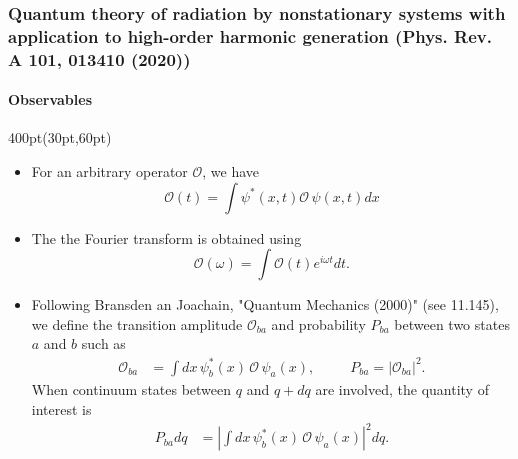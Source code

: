 \begin{frame}
\frametitle{Quantum theory of radiation by nonstationary systems 
	with application to high-order harmonic generation
        (Phys. Rev. A 101, 013410 (2020))}
	\framesubtitle{Observables}

\begin{textblock*}{400pt}(30pt,60pt)
\footnotesize
\begin{itemize}
	\item For an arbitrary operator $\mathcal{O}$, we have   
\begin{equation}
	\mathcal{O}(t) = \int \psi^{*}(x,t)\mathcal{O}\,\psi(x,t)dx
\label{eqn:mean_value}
\end{equation}
\item The the Fourier transform is obtained using 
\begin{equation}
	\mathcal{O}(\omega) = \int \mathcal{O}(t)e^{i\omega t}dt.
\label{eqn:fourier}
\end{equation}
\item Following Bransden an Joachain, "Quantum Mechanics (2000)" (see 11.145), we define the transition amplitude $\mathcal{O}_{ba}$  and probability $P_{ba}$ 
 between two states $a$ and $b$ such as
\begin{align}
	\mathcal{O}_{ba} & = \int dx\, \psi_b^*(x)\,\mathcal{O}\,\psi_a (x), 
	\hspace{30pt}
	P_{ba}  = \left| \mathcal{O}_{ba} \right|^2.
\end{align}
When continuum states between $q$ and $q+dq$ are involved,
the quantity of interest is  
\begin{align}
	P_{ba} dq & = \left| \int dx\, \psi^*_b(x)\,\mathcal{O}\,
	 \psi_a (x) \right|^2 dq.
\end{align}
\end{itemize}
\end{textblock*}


\end{frame}


